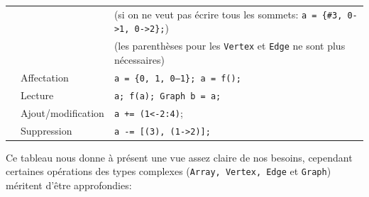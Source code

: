 \documentclass[french]{article}
\begin{document}
\begin{longtable}{lll}
					& & (si on ne veut pas écrire tous les sommets: \texttt{a = \{\#3, 0->1, 0->2\};})\\
					& & (les parenthèses pour les \texttt{Vertex} et \texttt{Edge} ne sont plus nécessaires)\\
					& Affectation & \texttt{a = \{0, 1, 0--1\}; a = f();}\\
					& Lecture & \texttt{a; f(a); Graph b = a;}\\
					& Ajout/modification & \texttt{a += (1<-2:4)};\\
					& Suppression & \texttt{a -= [(3), (1->2)];}\\
				\end{longtable}
				
				Ce tableau nous donne à présent une vue assez claire de nos besoins, cependant certaines opérations des types complexes (\texttt{Array, Vertex, Edge} et \texttt{Graph}) méritent d'être approfondies:
				
\end{document}
